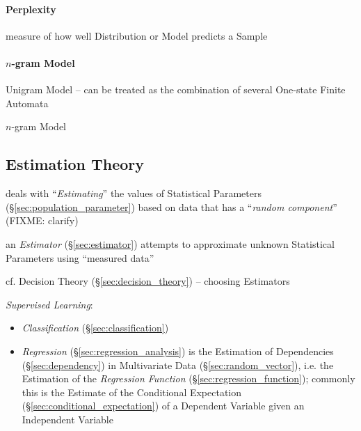 \paragraph{Perplexity}\label{sec:perplexity}\hfill

measure of how well Distribution or Model predicts a Sample




\paragraph{$n$-gram Model}\label{sec:ngram_model}\hfill

Unigram Model -- can be treated as the combination of several One-state Finite
Automata

$n$-gram Model



\subsection{Estimation Theory}\label{sec:estimation_theory}

deals with ``\emph{Estimating}'' the values of Statistical Parameters
(\S\ref{sec:population_parameter}) based on data that has a ``\emph{random
  component}'' (FIXME: clarify)

an \emph{Estimator} (\S\ref{sec:estimator}) attempts to approximate unknown
Statistical Parameters using ``measured data''

\fist cf. Decision Theory (\S\ref{sec:decision_theory}) -- choosing Estimators

\fist \emph{Supervised Learning}:
\begin{itemize}
  \item \emph{Classification} (\S\ref{sec:classification})
  \item \emph{Regression} (\S\ref{sec:regression_analysis}) is the Estimation of
    Dependencies (\S\ref{sec:dependency}) in Multivariate Data
    (\S\ref{sec:random_vector}), i.e. the Estimation of the \emph{Regression
      Function} (\S\ref{sec:regression_function}); commonly this is the Estimate
    of the Conditional Expectation (\S\ref{sec:conditional_expectation}) of a
    Dependent Variable given an Independent Variable
\end{itemize}

